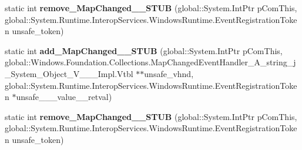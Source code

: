 \begin{DoxyCompactItemize}
\item 
\mbox{\label{struct_windows_1_1_foundation_1_1_collections_1_1_i_observable_map___a__string__j___system___object___v_______impl_1_1_vtbl_aeab9d91b53996d202ddf2ec84b918c08}} 
static int {\bfseries remove\+\_\+\+Map\+Changed\+\_\+\+\_\+\+S\+T\+UB} (global\+::\+System.\+Int\+Ptr p\+Com\+This, global\+::\+System.\+Runtime.\+Interop\+Services.\+Windows\+Runtime.\+Event\+Registration\+Token unsafe\+\_\+token)
\item 
\mbox{\label{struct_windows_1_1_foundation_1_1_collections_1_1_i_observable_map___a__string__j___system___object___v_______impl_1_1_vtbl_aac385382fcbf569438a34de44b202394}} 
static int {\bfseries add\+\_\+\+Map\+Changed\+\_\+\+\_\+\+S\+T\+UB} (global\+::\+System.\+Int\+Ptr p\+Com\+This, global\+::\+Windows.\+Foundation.\+Collections.\+Map\+Changed\+Event\+Handler\+\_\+\+A\+\_\+string\+\_\+j\+\_\+\+System\+\_\+\+Object\+\_\+\+V\+\_\+\+\_\+\+\_\+\+Impl.\+Vtbl $\ast$$\ast$unsafe\+\_\+vhnd, global\+::\+System.\+Runtime.\+Interop\+Services.\+Windows\+Runtime.\+Event\+Registration\+Token $\ast$unsafe\+\_\+\+\_\+\+\_\+value\+\_\+\+\_\+retval)
\item 
\mbox{\label{struct_windows_1_1_foundation_1_1_collections_1_1_i_observable_map___a__string__j___system___object___v_______impl_1_1_vtbl_aeab9d91b53996d202ddf2ec84b918c08}} 
static int {\bfseries remove\+\_\+\+Map\+Changed\+\_\+\+\_\+\+S\+T\+UB} (global\+::\+System.\+Int\+Ptr p\+Com\+This, global\+::\+System.\+Runtime.\+Interop\+Services.\+Windows\+Runtime.\+Event\+Registration\+Token unsafe\+\_\+token)
\end{DoxyCompactItemize}

